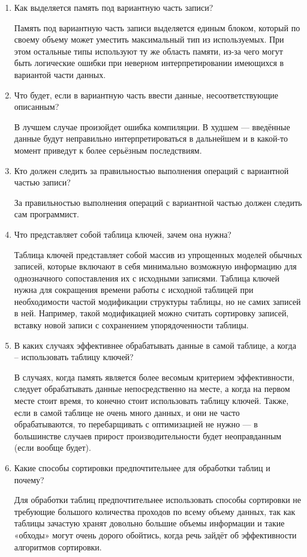 \begin{enumerate}
	\item Как выделяется память под вариантную часть записи?
	
	Память  под  вариантную  часть  записи  выделяется  единым  блоком, который  по  своему  объему  может  уместить  максимальный  тип  из используемых. При этом остальные типы используют ту же область памяти, 
	из-за чего могут быть логические ошибки при неверном интерпретировании имеющихся в вариантой части данных.
	
	\item Что  будет, если  в  вариантную  часть  ввести  данные,  несоответствующие 
	описанным?
	
	В  лучшем  случае  произойдет  ошибка  компиляции.  В  худшем  — введённые  данные будут неправильно интерпретироваться в дальнейшем и в какой-то момент приведут к более серьёзным последствиям.
	\item Кто  должен  следить  за  правильностью  выполнения  операций  с  вариантной 
	частью записи? 
	
	За правильностью выполнения операций с вариантной частью должен следить сам программист.
	
	\item Что представляет собой таблица ключей, зачем она нужна?
	
	Таблица ключей  представляет собой массив из упрощенных моделей обычных  записей,  которые  включают  в  себя  минимально  возможную информацию для однозначного сопоставления их с исходными записями. 
	Таблица ключей нужна для сокращения времени работы с исходной таблицей при необходимости частой модификации структуры таблицы, но не самих  записей  в  ней.  Например,  такой  модификацией  можно  считать сортировку записей, вставку новой записи с сохранением упорядоченности таблицы.
	
	\item В каких случаях эффективнее обрабатывать данные в самой таблице, а когда – 
	использовать таблицу ключей?
	
	В  случаях,  когда  память  является  более  весомым  критерием эффективности, следует обрабатывать данные непосредственно на месте, а когда на первом месте стоит время, то конечно стоит использовать таблицу ключей. 
	Также, если в самой таблице не очень много данных, и они не часто обрабатываются,  то  перебарщивать  с  оптимизацией не  нужно  — в большинстве  случаев  прирост  производительности  будет  неоправданным (если вообще будет). 
	
	\item Какие способы сортировки предпочтительнее для обработки таблиц и почему?
	
	Для  обработки  таблиц  предпочтительнее  использовать  способы сортировки не требующие большого количества проходов по всему объему данных,  так  как  таблицы  зачастую  хранят  довольно  большие  объемы информации и такие «обходы» могут очень дорого обойтись, когда речь зайдёт об эффективности алгоритмов сортировки.
\end{enumerate}

